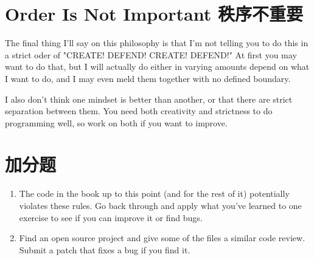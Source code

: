 \section{Order Is Not Important 秩序不重要}

The final thing I'll say on this philosophy is that I'm not telling you to do this in
a strict oder of "CREATE! DEFEND! CREATE! DEFEND!"  At first you may want to do that,
but I will actually do either in varying amounts depend on what I want to do, and I may
even meld them together with no defined boundary.

I also don't think one mindset is better than another, or that there are strict separation
between them.  You need both creativity and strictness to do programming well, so work
on both if you want to improve.


\section{加分题}

\begin{enumerate}
\item The code in the book up to this point (and for the rest of it) potentially violates these rules.  Go back through and apply what you've learned to one 
    exercise to see if you can improve it or find bugs.
\item Find an open source project and give some of the files a similar code review.  Submit a patch that fixes a bug if you find it.
\end{enumerate}

